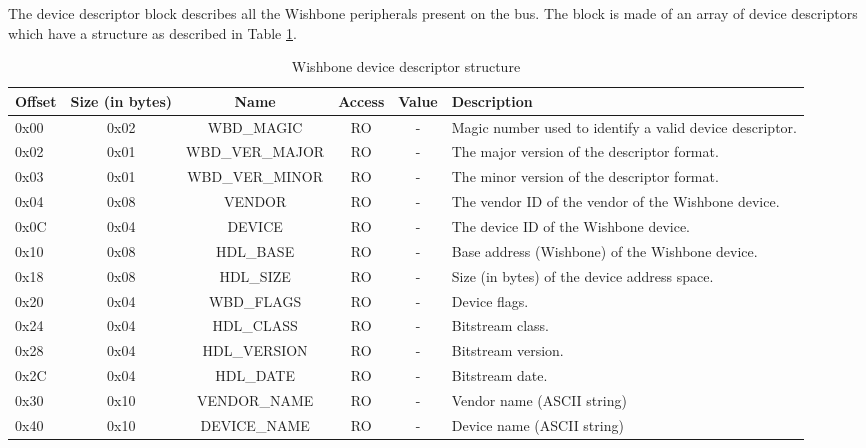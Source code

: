 \documentclass{article}
\begin{document}
The device descriptor block describes all the Wishbone peripherals present
on the bus. The block is made of an array of device descriptors which have
a structure as described in Table \ref{dev_desc_struct}.

\begin{center}
	\begin{savenotes}
	\begin{table}[!ht]\footnotesize
	\caption{Wishbone device descriptor structure}\label{dev_desc_struct}\centering
	\begin{tabular}{| l | c | c | c | c | p{5cm} |} \hline
	Offset & Size (in bytes) & Name & Access & Value & Description \\ \hline
	0x00 & 0x02 & WBD\_MAGIC & RO & - & Magic number used to identify a valid device descriptor. \\ \hline
	0x02 & 0x01 & WBD\_VER\_MAJOR & RO & - & The major version of the descriptor format. \\ \hline
	0x03 & 0x01 & WBD\_VER\_MINOR & RO & - & The minor version of the descriptor format. \\ \hline
	0x04 & 0x08 & VENDOR & RO & - & The vendor ID of the vendor of the Wishbone device. \\ \hline
	0x0C & 0x04 & DEVICE & RO & - & The device ID of the Wishbone device. \\ \hline
	0x10 & 0x08 & HDL\_BASE & RO & - & Base address (Wishbone) of the Wishbone device. \\ \hline
	0x18 & 0x08 & HDL\_SIZE & RO & - & Size (in bytes) of the device address space. \\ \hline
	0x20 & 0x04 & WBD\_FLAGS & RO & - & Device flags. \\ \hline
	0x24 & 0x04 & HDL\_CLASS & RO & - & Bitstream class. \\ \hline
	0x28 & 0x04 & HDL\_VERSION & RO & - & Bitstream version. \\ \hline
	0x2C & 0x04 & HDL\_DATE & RO & - & Bitstream date. \\ \hline
	0x30 & 0x10 & VENDOR\_NAME & RO & - & Vendor name (ASCII string) \\ \hline
	0x40 & 0x10 & DEVICE\_NAME & RO & - & Device name (ASCII string) \\ \hline
	\end{tabular}
	\end{table}
	\end{savenotes}
\end{center}
\end{document}
